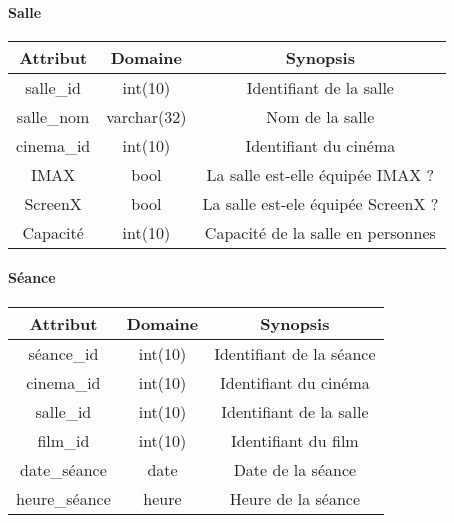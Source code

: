 \documentclass[12pt]{article}
\begin{document}
\paragraph*{Salle}
\begin{center}
    \begin{tabular}{||c c c||} 
     \hline
     Attribut & Domaine & Synopsis\\ [0.5ex] 
     \hline\hline
     salle{\_}id & int(10) & Identifiant de la salle \\ 
     \hline
     salle{\_}nom & varchar(32) & Nom de la salle \\
     \hline
     cinema{\_}id & int(10) & Identifiant du cinéma\\
     \hline
     IMAX & bool & La salle est-elle équipée IMAX ? \\
     \hline
     ScreenX & bool & La salle est-ele équipée ScreenX ? \\
     \hline
     Capacité & int(10) & Capacité de la salle en personnes \\
     \hline
    \end{tabular}
\end{center}
\paragraph*{Séance}
\begin{center}
    \begin{tabular}{||c c c||} 
     \hline
     Attribut & Domaine & Synopsis\\ [0.5ex] 
     \hline\hline
     séance{\_}id & int(10) & Identifiant de la séance \\ 
     \hline
     cinema{\_}id & int(10) & Identifiant du cinéma \\
     \hline
     salle{\_}id & int(10) & Identifiant de la salle\\
     \hline
     film{\_}id & int(10) & Identifiant du film \\
     \hline
     date{\_}séance & date & Date de la séance \\
     \hline
     heure{\_}séance & heure & Heure de la séance \\
     \hline
    \end{tabular}
\end{center}
\end{document}
